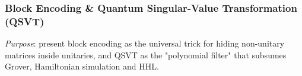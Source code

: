 

\subsubsection{Block Encoding \& Quantum Singular-Value Transformation (QSVT)}

\emph{Purpose}: present block encoding as the universal trick for hiding non-unitary matrices inside unitaries, 
and QSVT as the "polynomial filter" that subsumes Grover, Hamiltonian simulation and HHL.




